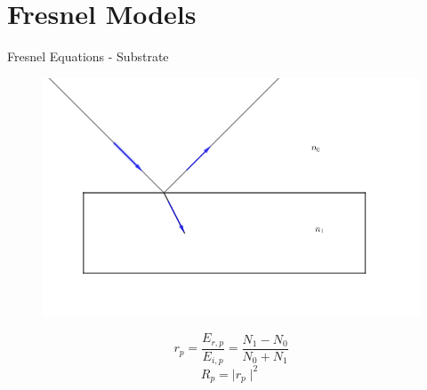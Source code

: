 \documentclass[10pt]{beamer}
\begin{document}
	

	
	\section{Fresnel Models}
	
\begin{frame}{Fresnel Equations - Substrate}

		\begin{figure}
			\hfill\includegraphics[width = \textwidth]{subrefl.png}\hspace*{\fill}
		\end{figure}
		\begin{equation*}
			r_p = \frac{E_{r,p}}{E_{i,p}} = \frac{N_1-N_0}{N_0+N_1}
		\end{equation*}
		\begin{equation*}
			R_p = \mid r_p \mid ^2 
		\end{equation*}

	

\end{frame}
	
\end{document}
